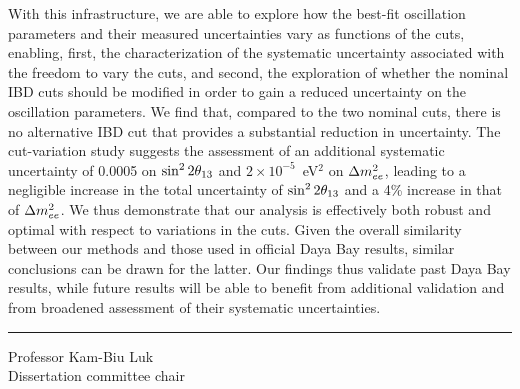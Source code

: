 With this infrastructure, we are able to explore how the best-fit oscillation parameters and their measured uncertainties vary as functions of the cuts, enabling, first, the characterization of the systematic uncertainty associated with the freedom to vary the cuts, and second, the exploration of whether the nominal IBD cuts should be modified in order to gain a reduced uncertainty on the oscillation parameters. We find that, compared to the two nominal cuts, there is no alternative IBD cut that provides a substantial reduction in uncertainty. The cut-variation study suggests the assessment of an additional systematic uncertainty of 0.0005 on $\sin^2 2\theta_{13}$ and $2\times10^{-5}$~eV$^2$ on $\Delta m^2_{ee}$, leading to a negligible increase in the total uncertainty of $\sin^2 2\theta_{13}$ and a 4\% increase in that of $\Delta m^2_{ee}$. We thus demonstrate that our analysis is effectively both robust and optimal with respect to variations in the cuts. Given the overall similarity between our methods and those used in official Daya Bay results, similar conclusions can be drawn for the latter. Our findings thus validate past Daya Bay results, while future results will be able to benefit from additional validation and from broadened assessment of their systematic uncertainties.

%

\SingleSpacing
\vspace{2.5\baselineskip}
\hfill
\begin{minipage}{0.4\textwidth}
  \hrule\vspace{0.4\baselineskip}
  Professor Kam-Biu Luk\\
  Dissertation committee chair
\end{minipage}

\clearpage